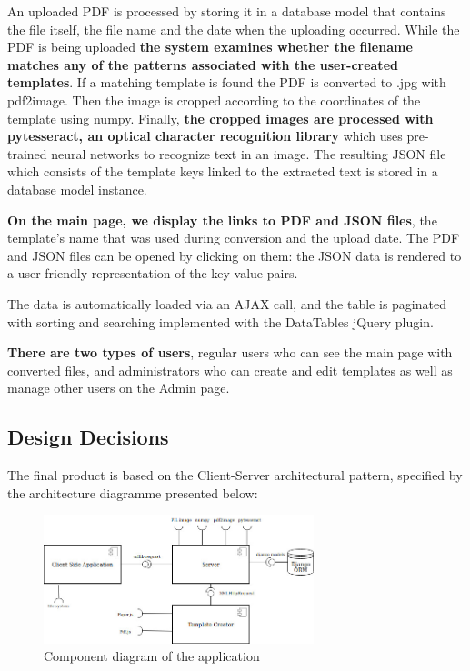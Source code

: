\documentclass{l3proj}
\begin{document}
An uploaded PDF is processed by storing it in a database model that contains the file itself, the file name and the date when the uploading occurred. While the PDF is being uploaded \textbf{the system examines whether the filename matches any of the patterns associated with the user-created templates}. If a matching template is found the PDF is converted to .jpg with pdf2image. Then the image is cropped according to the coordinates of the template using numpy. Finally, \textbf{the cropped images are processed with pytesseract, an optical character recognition library} which uses pre-trained neural networks to recognize text in an image. The resulting JSON file which consists of the template keys linked to the extracted text is stored in a database model instance.

\textbf{On the main page, we display the links to PDF and JSON files}, the template’s name that was used during conversion and the upload date. The PDF and JSON files can be opened by clicking on them: the JSON data is rendered to a user-friendly representation of the key-value pairs.

The data is automatically loaded via an AJAX call, and the table is paginated with sorting and searching implemented with the DataTables jQuery plugin.

\textbf{There are two types of users}, regular users who can see the main page with converted files, and administrators who can create and edit templates as well as manage other users on the Admin page.




\subsection{Design Decisions}

The final product is based on the Client-Server architectural pattern, specified by the architecture diagramme presented below:

\begin{figure}[h]
\includegraphics[width=0.7\textwidth]{figures/ComponentDiagram.png}
\centering
\caption{Component diagram of the application}
\label{fig:componentDiagram}
\end{figure}
\end{document}
